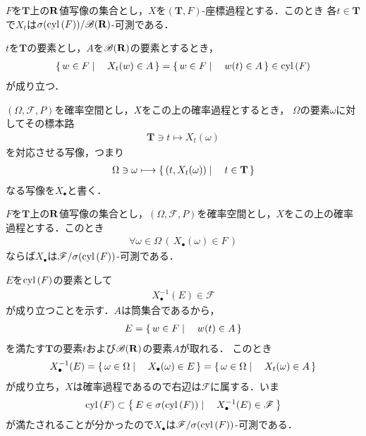 	\begin{screen}
		\begin{thm}[座標過程は確率過程]\label{thm:coordinate_process_is_stochastic}
			$F$を$\mathbf{T}$上の$\mathbf{R}$値写像の集合とし，$X$を$(\mathbf{T},F)$-座標過程とする．このとき
			各$t \in \mathbf{T}$で$X_t$は$\sigma(\operatorname{cyl}\left(F\right))/\mathscr{B}(\mathbf{R})$-可測である．
		\end{thm}
	\end{screen}
	
	\begin{sketch}
		$t$を$\mathbf{T}$の要素とし，$A$を$\mathscr{B}(\mathbf{R})$の要素とするとき，
		\begin{align}
			\left\{\, w \in F \mid \quad X_t(w) \in A\, \right\}
			= \left\{\, w \in F \mid \quad w(t) \in A\, \right\}
			\in \operatorname{cyl}\left(F\right)
		\end{align}
		が成り立つ．
		\QED
	\end{sketch}
	
	$(\Omega,\mathscr{F},P)$を確率空間とし，$X$をこの上の確率過程とするとき，
	$\Omega$の要素$\omega$に対してその標本路
	\begin{align}
		\mathbf{T} \ni t \longmapsto X_t(\omega)
	\end{align}
	を対応させる写像，つまり
	\begin{align}
		\Omega \ni \omega \longmapsto \left\{\, (t,X_t(\omega)) \mid \quad t \in \mathbf{T}\, \right\}
	\end{align}
	なる写像を$X_\bullet$と書く．
	\label{def:omega_to_path_mapping}
	
	\begin{screen}
		\begin{thm}
			$F$を$\mathbf{T}$上の$\mathbf{R}$値写像の集合とし，$(\Omega,\mathscr{F},P)$を確率空間とし，$X$をこの上の確率過程とする．このとき
			\begin{align}
				\forall \omega \in \Omega\, \left(\, X_\bullet(\omega) \in F\, \right)
			\end{align}
			ならば$X_\bullet$は$\mathscr{F}/\sigma(\operatorname{cyl}\left(F\right))$-可測である．
		\end{thm}
	\end{screen}
	
	\begin{sketch}
		$E$を$\operatorname{cyl}\left(F\right)$の要素として
		\begin{align}
			X_\bullet^{-1}(E) \in \mathscr{F}
		\end{align}
		が成り立つことを示す．$A$は筒集合であるから，
		\begin{align}
			E = \left\{\, w \in F \mid \quad w(t) \in A\, \right\}
		\end{align}
		を満たす$\mathbf{T}$の要素$t$および$\mathscr{B}(\mathbf{R})$の要素$A$が取れる．
		このとき
		\begin{align}
			X_\bullet^{-1}(E) = \left\{\, \omega \in \Omega \mid \quad X_\bullet(\omega) \in E\, \right\}
			= \left\{\, \omega \in \Omega \mid \quad X_t(\omega) \in A\, \right\}
		\end{align}
		が成り立ち，$X$は確率過程であるので右辺は$\mathscr{F}$に属する．いま
		\begin{align}
			\operatorname{cyl}\left(F\right) \subset \left\{\, E \in \sigma(\operatorname{cyl}\left(F\right)) \mid \quad X_\bullet^{-1}(E) \in \mathscr{F}\, \right\}
		\end{align}
		が満たされることが分かったので$X_\bullet$は$\mathscr{F}/\sigma(\operatorname{cyl}\left(F\right))$-可測である．
		\QED
	\end{sketch}
	
